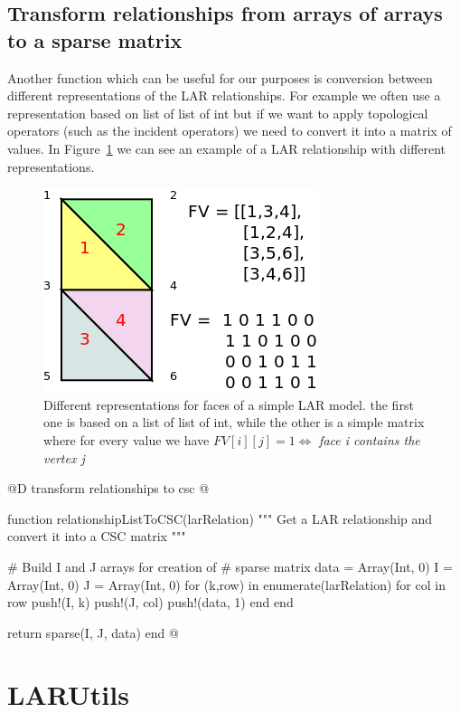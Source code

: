 \documentclass[11pt,oneside]{article}	%
\begin{document}
\subsection{Transform relationships from arrays of arrays to a sparse matrix}\label{sec:transformSparse}

Another function which can be useful for our purposes is conversion between different representations of the LAR relationships. For example we often use a representation based on list of list of int but if we want to apply topological operators (such as the incident operators) we need to convert it into a matrix of values. In Figure~\ref{fig:LARRepresentations} we can see an example of a LAR relationship with different representations.

\begin{figure}[htb] %
   \centering
   \includegraphics[width=0.45\linewidth]{images/LARRepresentations.png}
   \caption{Different representations for faces of a simple LAR model. the first one is based on a list of list of int, while the other is a simple matrix where for every value we have $FV[i][j] = 1 \iff $ \textit{face i contains the vertex j} }
   \label{fig:LARRepresentations}
\end{figure}

@D transform relationships to csc
@{function relationshipListToCSC(larRelation)
  """
  Get a LAR relationship
  and convert it into a CSC matrix
  """

  # Build I and J arrays for creation of
  # sparse matrix
  data = Array(Int, 0)
  I = Array(Int, 0)
  J = Array(Int, 0)
  for (k,row) in enumerate(larRelation)
    for col in row
      push!(I, k)
      push!(J, col)
      push!(data, 1)
    end
  end

  return sparse(I, J, data)
end @}

\section{LARUtils}\label{sec:LARUtils}
\end{document}
